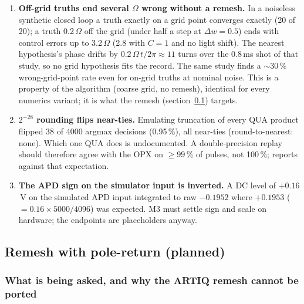 \begin{enumerate}[nosep]
  \item \textbf{Off-grid truths end several $\Omega$ wrong without a remesh.}
    In a noiseless synthetic closed loop a truth exactly on a grid point
    converges exactly (20 of 20); a truth 0.2\,$\Omega$ off the grid (under half
    a step at $\Delta w = 0.5$) ends with control errors up to 3.2\,$\Omega$ (2.8
    with $C = 1$ and no light shift). The nearest hypothesis's phase drifts by
    $0.2\,\Omega\,t/2\pi \approx 11$ turns over the 0.8\,ms shot of that study, so no
    grid hypothesis fits the record. The same study finds a $\sim$30\,\%
    wrong-grid-point rate even for on-grid truths at nominal noise. This is a
    property of the algorithm (coarse grid, no remesh), identical for every
    numerics variant; it is what the remesh
    (section~\ref{sec:feedback:remesh}) targets.
  \item \textbf{$2^{-28}$ rounding flips near-ties.} Emulating truncation of
    every QUA product flipped 38 of 4000 argmax decisions (0.95\,\%), all
    near-ties (round-to-nearest: none). Which one QUA does is undocumented. A
    double-precision replay should therefore agree with the OPX on $\ge
    99$\,\% of pulses, not 100\,\%;  reports against
    that expectation.
  \item \textbf{The APD sign on the simulator input is inverted.} A DC level
    of $+0.16$\,V on the simulated APD input integrated to raw $-0.1952$ where
    $+0.1953$ ($= 0.16 \times 5000/4096$) was expected. M3 must settle sign and
    scale on hardware; the endpoints are placeholders anyway.
\end{enumerate}

\subsection{Remesh with pole-return (planned)}
\label{sec:feedback:remesh}


\subsubsection{What is being asked, and why the ARTIQ remesh cannot be ported}

